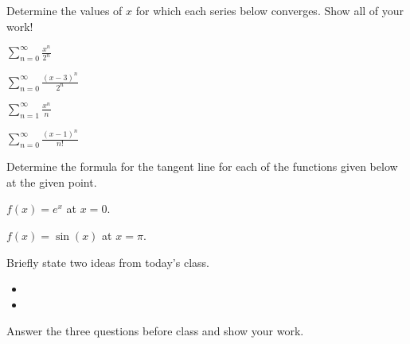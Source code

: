 \begin{problem}
\clearpage

\item Determine the values of $x$ for which each series
  below converges. Show all of your work!  
  \begin{subproblem}
    \item $\displaystyle \sum_{n=0}^\infty \frac{x^n}{2^n}$
      \vfill
    \item $\displaystyle \sum_{n=0}^\infty \frac{(x-3)^n}{2^n}$
      \vfill
      \clearpage
    \item $\displaystyle \sum_{n=1}^\infty \frac{x^n}{n} $
      \vfill
    \item $\displaystyle \sum_{n=0}^\infty \frac{(x-1)^n}{n!} $
      \vfill
  \end{subproblem}
  \clearpage
  \item Determine the formula for the tangent line for each of the functions given below at the given point.
  \begin{subproblem}
    \item $\displaystyle f(x)=e^x$ at $x=0$.
    \vfill
    \item $\displaystyle f(x)=\sin(x)$ at $x=\pi$.
    \vfill
  \end{subproblem}
\end{problem}


\postClass

\begin{problem}
\item Briefly state two ideas from today's class.
  \begin{itemize}
  \item
  \item
  \end{itemize}
\item
  \begin{subproblem}
    \item
  \end{subproblem}
\end{problem}



Answer the three questions before class and show your work.

